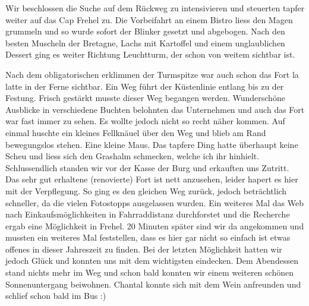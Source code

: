 Wir beschlossen die Suche auf dem Rückweg zu intensivieren und steuerten tapfer weiter auf das Cap Frehel zu.
Die Vorbeifahrt an einem Bistro liess den Magen grummeln und so wurde sofort der Blinker gesetzt und abgebogen.
Nach den besten Muscheln der Bretagne, Lachs mit Kartoffel und einem unglaublichen Dessert ging es weiter Richtung Leuchtturm, der schon von weitem sichtbar ist.

Nach dem obligatorischen erklimmen der Turmspitze war auch schon das Fort la latte in der Ferne sichtbar.
Ein Weg führt der Küstenlinie entlang bis zu der Festung.
Frisch gestärkt musste dieser Weg begangen werden.
Wunderschöne Ausblicke in verschiedene Buchten belohnten das Unternehmen und auch das Fort war fast immer zu sehen.
Es wollte jedoch nicht so recht näher kommen.
Auf einmal huschte ein kleines Fellknäuel über den Weg und blieb am Rand bewegungslos stehen.
Eine kleine Maus.
Das tapfere Ding hatte überhaupt keine Scheu und liess sich den Grashalm schmecken, welche ich ihr hinhielt.
Schlussendlich standen wir vor der Kasse der Burg und erkauften uns Zutritt.
Das sehr gut erhaltene (renovierte) Fort ist nett anzusehen, leider hapert es hier mit der Verpflegung.
So ging es den gleichen Weg zurück, jedoch beträchtlich schneller, da die vielen Fotostopps ausgelassen wurden.
Ein weiteres Mal das Web nach Einkaufsmöglichkeiten in Fahrraddistanz durchforstet und die Recherche ergab eine Möglichkeit in Frehel.
20 Minuten später sind wir da angekommen und mussten ein weiteres Mal feststellen, dass es hier gar nicht so einfach ist etwas offenes in dieser Jahreszeit zu finden.
Bei der letzten Möglichkeit hatten wir jedoch Glück und konnten uns mit dem wichtigsten eindecken.
Dem Abendessen stand nichts mehr im Weg und schon bald konnten wir einem weiteren schönen Sonnenuntergang beiwohnen.
Chantal konnte sich mit dem Wein anfreunden und schlief schon bald im Bus :)

